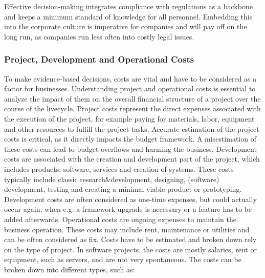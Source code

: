 \newline \noindent Effective decision-making integrates compliance with regulations as a backbone and keeps a minimum standard of knowledge for all personnel. Embedding this into the corporate culture is imperative for companies and will pay off on the long run, as companies run less often into costly legal issues. \cite{kempe_perspectives_2021}

\subsubsection{Project, Development and Operational Costs}
To make evidence-based decisions, costs are vital and have to be considered as a factor for businesses. Understanding project and operational costs is essential to analyze the impact of them on the overall financial structure of a project over the course of the livecycle. 
\newline \noindent Project costs represent the direct expenses associated with the execution of the project, for example paying for materials, labor, equipment and other resources to fulfill the project tasks. Accurate estimation of the project costs is critical, as it directly impacts the budget framework. A misestimation of these costs can lead to budget overflows and harming the business. 
\newline \noindent Development costs are associated with the creation and development part of the project, which includes products, software, services and creation of systems. These costs typically include classic research\&development, designing, (software) development, testing and creating a minimal viable product or prototyping. Development costs are often considered as one-time expenses, but could actually occur again, when e.g. a framework upgrade is necessary or a feature has to be added afterwards. 
\newline \noindent Operational costs are ongoing expenses to maintain the business operation. These costs may include rent, maintenance or utilities and can be often considered as fix. 
\newline \noindent Costs have to be estimated and broken down rely on the type of project. In software projects, the costs are mostly salaries, rent or equipment, such as servers, and are not very spontaneous. The costs can be broken down into different types, such as: 


